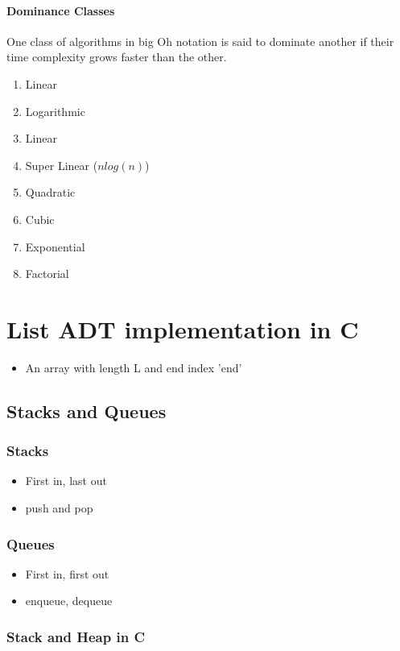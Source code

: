 \documentclass[a4paper,12pt]{report}
\begin{document}
\subsubsection{Dominance Classes}
One class of algorithms in big Oh notation is said to dominate another if their time complexity grows faster than the other.
\begin{enumerate}
\item Linear
\item Logarithmic
\item Linear
\item Super Linear ($n log(n)$)
\item Quadratic
\item Cubic
\item Exponential
\item Factorial
\end{enumerate}
	

\chapter{List ADT implementation in C}
\begin{itemize}
\item An array with length L and end index 'end'
\end{itemize}

\section{Stacks and Queues}
\subsection{Stacks}
\begin{itemize}
\item First in, last out
\item push and pop
\end{itemize}
\subsection{Queues}
\begin{itemize}
\item First in, first out
\item enqueue, dequeue
\end{itemize}

\subsection{Stack and Heap in C}
\end{document}

